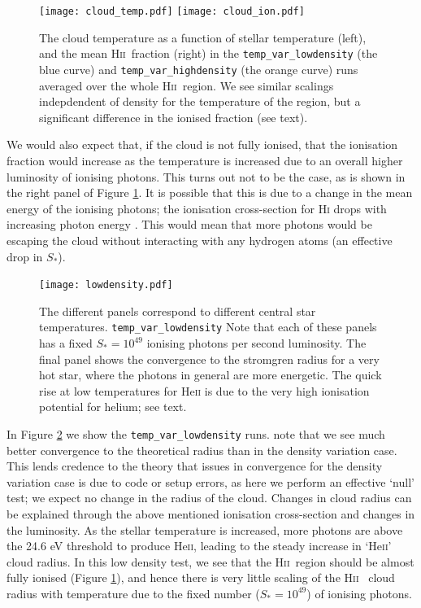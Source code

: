 \documentclass[a4paper]{article}
\newcommand{\hii}{H\textsc{ii}~}
\begin{document}
\begin{figure}[!h]
    \centering
    \texttt{[image: cloud\_temp.pdf]}
    \texttt{[image: cloud\_ion.pdf]}
    \caption{\small The cloud temperature as a function of stellar temperature (left),
        and the mean \hii fraction (right) in the {\tt temp\_var\_lowdensity}
        (the blue curve) and {\tt temp\_var\_highdensity} (the orange curve)
        runs averaged over the whole \hii region. We see similar scalings
        indepdendent of density for the temperature of the region, but a
        significant difference in the ionised fraction (see text).}
    \label{fig:cloudtemp}
\end{figure}
We would also expect that, if the cloud is not fully ionised, that the
ionisation fraction would increase as the temperature is increased due to an
overall higher luminosity of ionising photons. This turns out not to be the
case, as is shown in the right panel of Figure \ref{fig:cloudtemp}. It is
possible that this is due to a change in the mean energy of the ionising
photons; the ionisation cross-section for H\textsc{i} drops with increasing
photon energy \citep{palenius_absolute_1976}. This would mean that more
photons would be escaping the cloud without interacting with any hydrogen
atoms (an effective drop in $S_*$). 

\begin{figure}[!h]
    \centering
    \texttt{[image: lowdensity.pdf]}
    \caption{\small The different panels correspond to different central star
        temperatures. {\tt temp\_var\_lowdensity} Note that each of these
        panels has a fixed $S_* = 10^{49}$ ionising photons per second
        luminosity. The final panel shows the convergence to the stromgren
        radius for a very hot star, where the photons in general are more
        energetic. The quick rise at low temperatures for He\textsc{ii} is due to
        the very high ionisation potential for helium; see text.}
    \label{fig:templowdens}
\end{figure}
In Figure \ref{fig:templowdens} we show the {\tt temp\_var\_lowdensity} runs.
note that we see much better convergence to the theoretical
\citet{stromgren_physical_1939} radius than in the density variation case.
This lends credence to the theory that issues in convergence for the density
variation case is due to code or setup errors, as here we perform an effective
`null' test; we expect no change in the radius of the cloud. Changes in cloud
radius can be explained through the above mentioned ionisation cross-section
and changes in the luminosity. As the stellar temperature is increased, more
photons are above the 24.6 eV threshold to produce He\textsc{ii}, leading to
the steady increase in `He\textsc{ii}' cloud radius. In this low density test,
we see that the \hii region should be almost fully ionised (Figure
\ref{fig:cloudtemp}), and hence there is very little scaling of the \hii
cloud radius with temperature due to the fixed number ($S_* = 10^{49}$) of
ionising photons.
\end{document}
